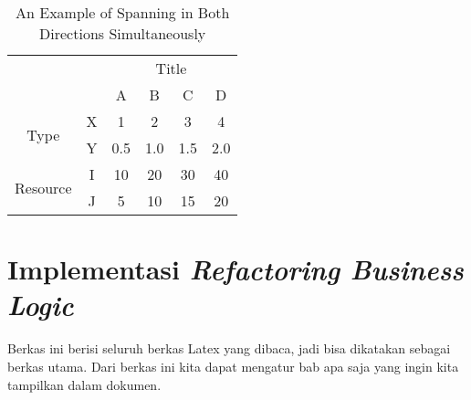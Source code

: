 \begin{table}
	\centering
	\caption{An Example of Spanning in Both Directions Simultaneously}
	\label{mix.spanning}
	\begin{tabular}{cc|c|c|c|c|}
		\cline{3-6}
		& & \multicolumn{4}{|c|}{Title} \\ \cline{3-6}
		& & A & B & C & D \\ \hline
		\multicolumn{1}{|c|}{\multirow{2}{*}{Type}} &
		\multicolumn{1}{|c|}{X} & 1 & 2 & 3 & 4\\ \cline{2-6}
		\multicolumn{1}{|c|}{}                        &
		\multicolumn{1}{|c|}{Y} & 0.5 & 1.0 & 1.5 & 2.0\\ \cline{1-6}
		\multicolumn{1}{|c|}{\multirow{2}{*}{Resource}} &
		\multicolumn{1}{|c|}{I} & 10 & 20 & 30 & 40\\ \cline{2-6}
		\multicolumn{1}{|c|}{}                        &
		\multicolumn{1}{|c|}{J} & 5 & 10 & 15 & 20\\ \cline{1-6}
	\end{tabular}
\end{table}

\section{Implementasi \textit{Refactoring Business Logic}}
Berkas ini berisi seluruh berkas Latex yang dibaca, jadi bisa dikatakan sebagai 
berkas utama. Dari berkas ini kita dapat mengatur bab apa saja yang ingin 
kita tampilkan dalam dokumen.
